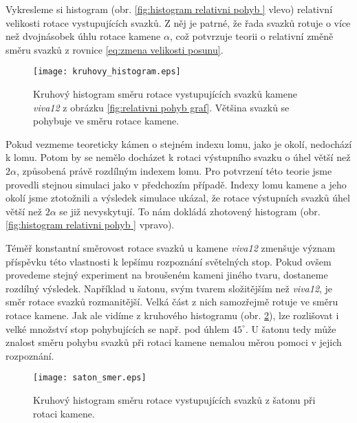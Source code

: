 Vykresleme si histogram (obr. \ref{fig:histogram relativni pohyb } vlevo) relativní velikosti rotace vystupujících svazků. Z něj je patrné, že řada svazků rotuje o více než dvojnásobek úhlu rotace kamene $\alpha$, což potvrzuje teorii o relativní změně směru svazků z rovnice \ref{eq:zmena velikosti posunu}. 



\begin{figure}[h!]
\begin{center}
\texttt{[image: kruhovy\_histogram.eps]}
\end{center}
\caption[Kruhový histogram směru rotace svazků - \textit{viva12}.]{Kruhový histogram směru rotace vystupujících svazků kamene \textit{viva12} z obrázku \ref{fig:relativni pohyb graf}. Většina svazků se pohybuje ve směru rotace kamene.}
\label{fig:kruhovy histogram}
\end{figure}

Pokud vezmeme teoreticky kámen o stejném indexu lomu, jako je okolí, nedochází k lomu. Potom by se nemělo docházet k rotaci výstupního svazku o úhel větší než $2\alpha$, způsobená právě rozdílným indexem lomu. Pro potvrzení této teorie jsme provedli stejnou simulaci jako v předchozím případě. Indexy lomu kamene a jeho okolí jsme ztotožnili a výsledek simulace ukázal, že rotace výstupních svazků úhel větší než $2\alpha$ se již nevyskytují. To nám dokládá zhotovený histogram (obr. \ref{fig:histogram relativni pohyb } vpravo).


Téměř konstantní směrovost rotace svazků u kamene \textit{viva12} zmenšuje význam příspěvku této vlastnosti k lepšímu rozpoznání světelných stop. Pokud ovšem provedeme stejný experiment na broušeném kameni jiného tvaru, dostaneme rozdílný výsledek. Například u šatonu, svým tvarem složitějším než \textit{viva12}, je směr rotace svazků rozmanitější. Velká část z nich samozřejmě rotuje ve směru rotace kamene. Jak ale vidíme z kruhového histogramu (obr. \ref{fig:kruhovy histogram saton}), lze rozlišovat i velké množství stop pohybujících se např. pod úhlem $45^\circ$. U šatonu tedy může znalost směru pohybu svazků při rotaci kamene nemalou měrou pomoci v jejich rozpoznání. 

\begin{figure}
\begin{center}
\texttt{[image: saton\_smer.eps]}
\end{center}
\caption[Kruhový histogram směru rotace svazků - šaton.]{Kruhový histogram směru rotace vystupujících svazků z šatonu při rotaci kamene.}

\label{fig:kruhovy histogram saton}
\end{figure}

  
\clearpage